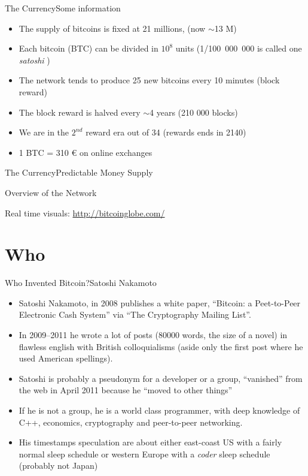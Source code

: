 \documentclass[english,compress]{beamer}
\newcommand{\challenge}{\pgfuseimage{challenge}}
\begin{document}
\begin{frame}{The Currency}{Some information}
 \begin{itemize}
  \item The supply of bitcoins is fixed at 21 millions, (now $\sim$13 M)
  \item Each bitcoin (BTC) can be divided in $10^8$ units (\mbox{1/100 000 000} is called one \emph{satoshi} )
  \item The network tends to produce 25 new bitcoins every 10 minutes (block reward)
  \item The block reward is halved every $\sim$4 years (210 000 blocks)
  \item We are in the $2^{nd}$ reward era out of 34 (rewards ends in 2140)
  \item 1 BTC = 310 € on online exchanges
 \end{itemize}

\end{frame}

\begin{frame}{The Currency}{Predictable Money Supply}
\end{frame}

\begin{frame}{Overview of the Network}


\begin{scriptsize}Real time visuals: \url{http://bitcoinglobe.com/}\end{scriptsize}
\end{frame}

\section{Who}

\begin{frame}{Who Invented Bitcoin?}{Satoshi Nakamoto}

\begin{scriptsize}\begin{itemize}
\item Satoshi Nakamoto, in 2008 publishes a white paper, ``Bitcoin: a Peet-to-Peer Electronic Cash System'' via ``The Cryptography Mailing List''.
 \item In 2009--2011 he wrote a lot of posts (80000 words, the size of a novel) in flawless english with British colloquialisms (aside only the first post where he used American spellings).
 \item Satoshi is probably a pseudonym for a developer or a group, “vanished” from the web in April 2011 because he “moved to other things” 
 \item If he is not a group, he is a world class programmer, with deep knowledge of C++, economics, cryptography and peer-to-peer networking.
 \item His timestamps speculation are about either east-coast US with a fairly normal sleep schedule or western Europe with a \emph{coder} sleep schedule (probably not Japan)
\end{itemize}\end{scriptsize}

\challenge
\end{frame}
\end{document}

